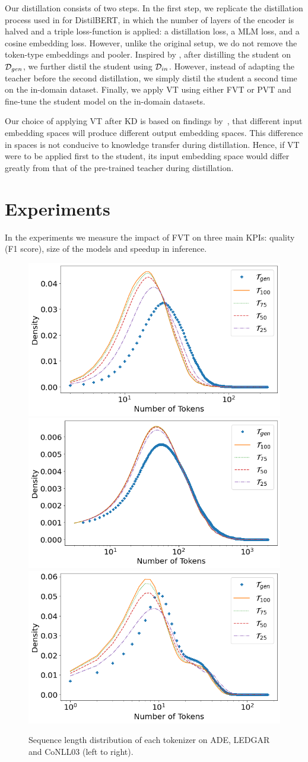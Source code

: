 \documentclass[11pt]{article}
\begin{document}
Our distillation consists of two steps. In the first step, we replicate the distillation process used in \cite{distilbert} for DistilBERT, in which the number of layers of the encoder is halved and a triple loss-function is applied: a distillation loss, a MLM loss, and a cosine embedding loss. However, unlike the original setup, we do not remove the token-type embeddings and pooler.
Inspired by  \citet{gordon-duh-2020-distill}, after distilling the student on ${\cal D}_{gen}$, we further distil the student using  ${\cal D}_{in}$. 
However, instead of adapting the teacher before the second distillation, we simply distil the student a second time on the in-domain dataset. Finally, we apply VT using either FVT or PVT and fine-tune the student model on the in-domain datasets.

Our choice of applying VT after KD is based on findings by~\citet{kim-hassan-2020-fastformers}, that different input embedding spaces will produce different output embedding spaces. This difference in spaces is not conducive to knowledge transfer during distillation. Hence, if VT were to be applied first to the student, its input embedding space would differ greatly from that of the pre-trained teacher during distillation.

\section{Experiments}\label{sec:experiments}
In the experiments we measure the impact of FVT on three main KPIs: quality (F1 score), size of the models and speedup in inference.


\begin{figure}[h]
  \centering
  \includegraphics[width=.325\textwidth]{images/tokenizers_ADE.png} %
  \includegraphics[width=.332\textwidth]{images/tokenizers_LED.png}
  \includegraphics[width=.325\textwidth]{images/tokenizers_NLL.png}
  \caption{ Sequence length distribution of each tokenizer on ADE, LEDGAR and CoNLL03 (left to right).}\label{fig:tok_distribution}
\end{figure}
\end{document}
